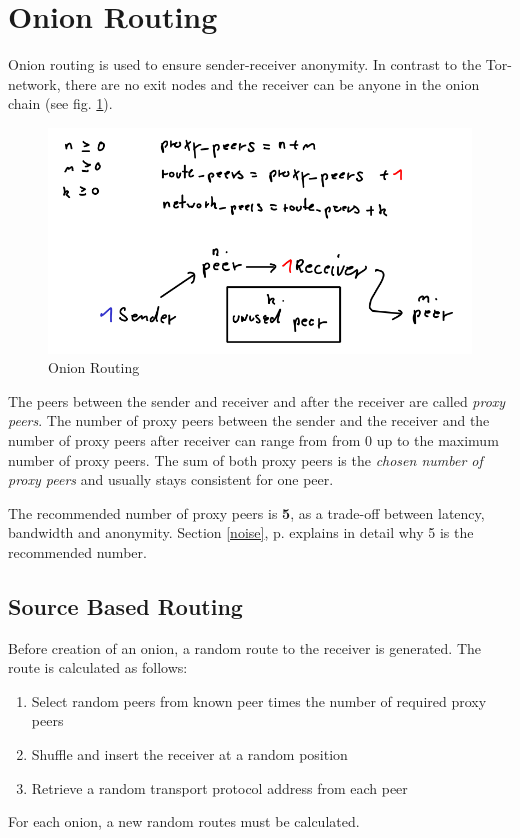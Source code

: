 \section{Onion Routing}
\label{onionrouting}
Onion routing is used to ensure sender-receiver anonymity. In contrast
to the Tor-network, there are no exit nodes and the receiver can be anyone
in the onion chain (see fig. \ref{onionrouting}).
\begin{figure}
    \centering
    \caption{Onion Routing}
    \label{onionrouting}
    \includegraphics[scale=0.8]{onionrouting.png}
\end{figure}
The peers between the sender and receiver and after the receiver are
called \textit{proxy peers}. The number of proxy peers between the
sender and the receiver and the number of proxy peers after receiver
can range from from 0 up to the maximum number of proxy peers. The sum
of both proxy peers is the \textit{chosen number of proxy peers} and
usually stays consistent for one peer.

The recommended number of proxy peers is \textbf{5}, as a trade-off between
latency, bandwidth and anonymity. Section \ref{noise}, p. \pageref{noise}
explains in detail why 5 is the recommended number.
\subsection{Source Based Routing}
Before creation of an onion, a random route to the receiver is generated.
The route is calculated as follows:
\begin{enumerate}
\item Select random peers from known peer times the number of required proxy peers
\item Shuffle and insert the receiver at a random position
\item Retrieve a random transport protocol address from each peer
\end{enumerate}
For each onion, a new random routes must be calculated.
